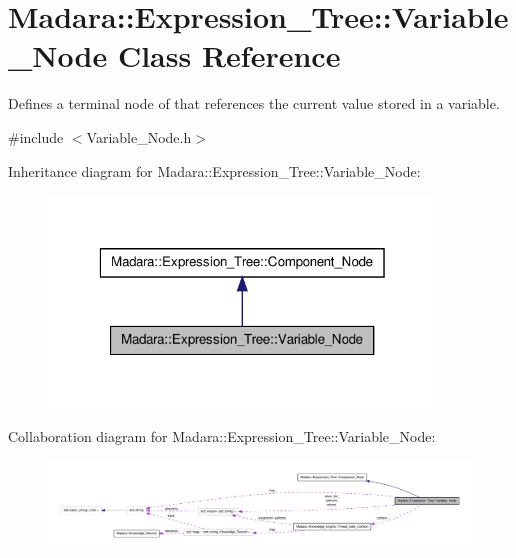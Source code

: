 \hypertarget{classMadara_1_1Expression__Tree_1_1Variable__Node}{
\section{Madara::Expression\_\-Tree::Variable\_\-Node Class Reference}
\label{df/d66/classMadara_1_1Expression__Tree_1_1Variable__Node}
}


Defines a terminal node of that references the current value stored in a variable.  




{\ttfamily \#include $<$Variable\_\-Node.h$>$}



Inheritance diagram for Madara::Expression\_\-Tree::Variable\_\-Node:
\nopagebreak
\begin{figure}[H]
\begin{center}
\leavevmode
\includegraphics[width=292pt]{d3/d33/classMadara_1_1Expression__Tree_1_1Variable__Node__inherit__graph}
\end{center}
\end{figure}


Collaboration diagram for Madara::Expression\_\-Tree::Variable\_\-Node:
\nopagebreak
\begin{figure}[H]
\begin{center}
\leavevmode
\includegraphics[width=400pt]{d7/dc2/classMadara_1_1Expression__Tree_1_1Variable__Node__coll__graph}
\end{center}
\end{figure}
